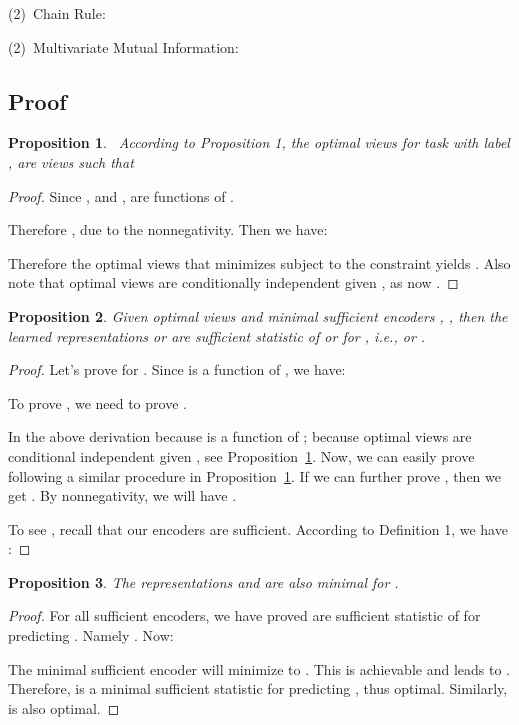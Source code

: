 \documentclass{article}
\newtheorem{prop}{Proposition}[section]
\begin{document}
\noindent(2)~Chain Rule:

\noindent(2)~Multivariate Mutual Information:



\subsection{Proof}
\begin{prop}~\label{prop:1}
According to Proposition 1, the optimal views  for task  with label , are views such that 
\end{prop}
\begin{proof}
Since , and ,  are functions of .

Therefore , due to the nonnegativity. Then we have:

Therefore the optimal views  that minimizes  subject to the constraint yields . Also note that optimal views  are conditionally independent given , as now . 
\end{proof}

\begin{prop}
Given optimal views  and minimal sufficient encoders , , then the learned representations  or  are sufficient statistic of  or  for , i.e.,  or .
\end{prop}
\begin{proof}
Let's prove for . Since  is a function of , we have:

To prove , we need to prove .

In the above derivation  because  is a function of ;  because optimal views  are conditional independent given , see Proposition~\ref{prop:1}. Now, we can easily prove  following a similar procedure in Proposition~\ref{prop:1}. If we can further prove , then we get . By nonnegativity, we will have .

To see , recall that our encoders are sufficient. According to Definition 1, we have :

\end{proof}

\begin{prop}
The representations  and  are also minimal for .
\end{prop}
\begin{proof}
For all sufficient encoders, we have proved  are sufficient statistic of  for predicting . Namely . Now:

The minimal sufficient encoder will minimize  to . This is achievable and leads to . Therefore,  is a minimal sufficient statistic for predicting , thus optimal. Similarly,  is also optimal. \end{proof}
\end{document}
